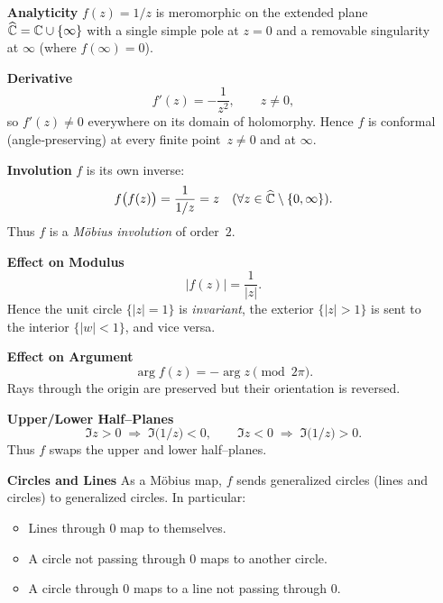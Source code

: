 \documentclass[12pt]{article}
\theoremstyle{definition} %
\theoremstyle{plain} %
\begin{document}
\begin{itemize}
   \item[\textbf{Analyticity}] 
         \(f(z)=1/z\) is meromorphic on the extended plane  
         \(\widehat{\Bbb C}=\Bbb C\cup\{\infty\}\)
         with a single simple pole at \(z=0\) and a removable
         singularity at \(\infty\) (where \(f(\infty)=0\)).
   
   \item[\textbf{Derivative}] 
         \[
           f'(z)=-\frac{1}{z^{2}},\qquad z\neq0,
         \]
         so \(f'(z)\neq0\) everywhere on its domain of holomorphy.
         Hence \(f\) is conformal (angle‐preserving) at every finite
         point \(\,z\neq0\) and at \(\infty\).
   
   \item[\textbf{Involution}] 
         \(f\) is its own inverse:
         \[
             f\bigl(f(z)\bigr)=\frac{1}{1/z}=z
             \quad
             (\forall z\in\widehat{\Bbb C}\setminus\{0,\infty\}).
         \]
         Thus \(f\) is a \emph{Möbius involution} of order~\(2\).
   
   \item[\textbf{Effect on Modulus}] 
         \[
           |f(z)|=\frac{1}{|z|}.
         \]
         Hence the unit circle \(\{|z|=1\}\) is \emph{invariant},
         the exterior \(\{|z|>1\}\) is sent to the interior
         \(\{|w|<1\}\), and vice versa.
   
   \item[\textbf{Effect on Argument}] 
         \[
           \arg f(z)= -\arg z \pmod{2\pi}.
         \]
         Rays through the origin are preserved
         but their orientation is reversed.
   
   \item[\textbf{Upper/Lower Half–Planes}] 
         \[
           \Im z>0 \;\Longrightarrow\; \Im\!\bigl(1/z\bigr)<0,
         \qquad
           \Im z<0 \;\Longrightarrow\; \Im\!\bigl(1/z\bigr)>0.
         \]
         Thus \(f\) swaps the upper and lower half–planes.
   
   \item[\textbf{Circles and Lines}] 
         As a Möbius map, \(f\) sends generalized circles
         (lines and circles) to generalized circles.  
         In particular:
         \begin{itemize}
           \item Lines through \(0\) map to themselves.
           \item A circle not passing through \(0\) maps to another circle.
           \item A circle through \(0\) maps to a line not passing through \(0\).
         \end{itemize}
   

\end{itemize}
\end{document}
